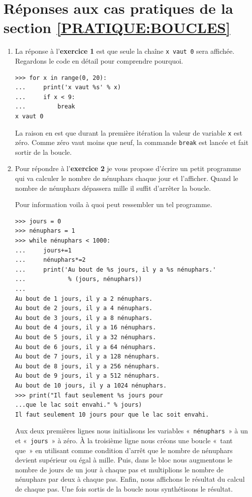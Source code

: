 \section{Réponses aux cas pratiques de la section  \ref{PRATIQUE:BOUCLES}\label{REPONSES:BOUCLES}}
\begin{enumerate}
\item La réponse à l'\textbf{exercice 1} est que seule la chaîne \texttt{x vaut 0} sera affichée. Regardons le code en détail pour comprendre pourquoi.
\begin{Verbatim}[frame=single,rulecolor=\color{gray}, label=ne pas taper]
>>> for x in range(0, 20):
... 	print('x vaut %s' % x)
... 	if x < 9:
... 		break
x vaut 0
\end{Verbatim}

La raison en est que durant la première itération la valeur de variable \texttt{x} est zéro. Comme zéro vaut moins que neuf, la commande \texttt{break} est lancée et fait sortir de la boucle.

\item Pour répondre à l'\textbf{exercice 2} je vous propose d'écrire un petit programme qui va calculer le nombre de nénuphars chaque jour et l'afficher. Quand le nombre de nénuphars dépassera mille il suffit d'arrêter la boucle.

Pour information voila à quoi peut ressembler un tel programme.
\begin{Verbatim}[frame=single,rulecolor=\color{gray}, label=ne pas taper]
>>> jours = 0
>>> nénuphars = 1
>>> while nénuphars < 1000:
...     jours+=1
...     nénuphars*=2 
...     print('Au bout de %s jours, il y a %s nénuphars.' 
...            % (jours, nénuphars))
... 
Au bout de 1 jours, il y a 2 nénuphars.
Au bout de 2 jours, il y a 4 nénuphars.
Au bout de 3 jours, il y a 8 nénuphars.
Au bout de 4 jours, il y a 16 nénuphars.
Au bout de 5 jours, il y a 32 nénuphars.
Au bout de 6 jours, il y a 64 nénuphars.
Au bout de 7 jours, il y a 128 nénuphars.
Au bout de 8 jours, il y a 256 nénuphars.
Au bout de 9 jours, il y a 512 nénuphars.
Au bout de 10 jours, il y a 1024 nénuphars.
>>> print("Il faut seulement %s jours pour 
...que le lac soit envahi." % jours)
Il faut seulement 10 jours pour que le lac soit envahi.
\end{Verbatim}

Aux deux premières lignes nous initialisons les variables «~\verb+nénuphars+~» à un et «~\verb+jours+~» à zéro.  
À la troisième ligne nous créons une boucle «~tant que~» en utilisant comme condition d'arrêt que le nombre de nénuphars devient supérieur ou égal à mille. Puis, dans le bloc nous augmentons le nombre de jours de un jour à chaque pas et multiplions le nombre de nénuphars par deux à chaque pas. Enfin, nous affichons le résultat du calcul de chaque pas. Une fois sortis de la boucle nous synthétisons le résultat. 
\end{enumerate}

